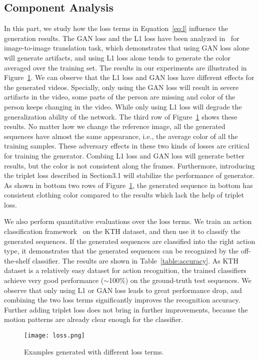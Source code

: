 \documentclass[journal]{IEEEtran}
\begin{document}
\subsection{Component Analysis}
In this part, we study how the loss terms in Equation~\ref{eq:l} influence the generation results. The GAN loss and the L1 loss have been analyzed in~\cite{DBLP:journals/corr/IsolaZZE16} for image-to-image translation task, which demonstrates that using GAN loss alone will generate artifacts, and using L1 loss alone tends to generate the color averaged over the training set. The results in our experiments are illustrated in Figure~\ref{fig:loss}.
We can observe that the L1 loss and GAN loss have different effects for the generated videos. Specially, only using the GAN loss will result in severe artifacts in the video, some parts of the person are missing and color of the person keeps changing in the video. While only using L1 loss will degrade the generalization ability of the network. The third row of Figure~\ref{fig:loss} shows these results. No matter how we change the reference image, all the generated sequences have almost the same appearance, i.e., the average color of all the training samples. These adversary effects in these two kinds of losses are critical for training the generator. Combing L1 loss and GAN loss will generate better results, but the color is not consistent along the frames. Furthermore, introducing the triplet loss described in Section3.1 will stabilize the performance of generator. As shown in bottom two rows of Figure~\ref{fig:loss}, the generated sequence in bottom has consistent clothing color compared to the results which lack the help of triplet loss.

We also perform quantitative evaluations over the loss terms. We train an action classification framework~\cite{DBLP:journals/pami/DonahueHRVGSD17} on the KTH dataset, and then use it to classify the generated sequences. If the generated sequences are classified into the right action type, it demonstrates that the generated sequences can be recognized by the off-the-shelf classifier. The results are shown in Table~\ref{table:accuracy}.
As KTH dataset is a relatively easy dataset for action recognition, the trained classifiers achieve very good performance ($\sim$100\%) on the ground-truth test sequences. We observe that only using L1 or GAN loss leads to great performance drop, and combining the two loss terms significantly improves the recognition accuracy. Further adding triplet loss does not bring in further improvements, because the motion patterns are already clear enough for the classifier.
\begin{figure}
\texttt{[image: loss.png]}
\caption{Examples generated with different loss terms.}
\label{fig:loss}
\end{figure}
\end{document}
